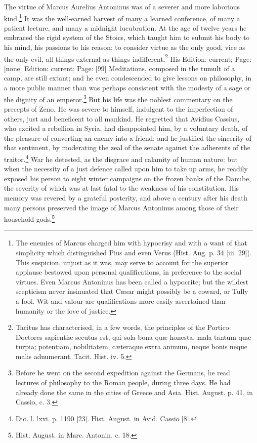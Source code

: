 The virtue of Marcus Aurelius Antoninus was of a severer and more laborious kind.\footnote{The enemies of Marcus charged him with hypocrisy and with a want of that simplicity which distinguished Pius and even Verus (Hist. Aug. p. 34 [iii. 29]). This suspicion, unjust as it was, may serve to account for the superior applause bestowed upon personal qualifications, in preference to the social virtues. Even Marcus Antoninus has been called a hypocrite; but the wildest scepticism never insinuated that Cæsar might possibly be a coward, or Tully a fool. Wit and valour are qualifications more easily ascertained than humanity or the love of justice.} It was the well-earned harvest of many a learned conference, of many a patient lecture, and many a midnight lucubration. At the age of twelve years he embraced the rigid system of the Stoics, which taught him to submit his body to his mind, his passions to his reason; to consider virtue as the only good, vice as the only evil, all things external as things indifferent.\footnote{Tacitus has characterised, in a few words, the principles of the Portico: Doctores sapientiæ secutus est, qui sola bona quæ honesta, mala tantum quæ turpia; potentiam, nobilitatem, cæteraque extra animum, neque bonis neque malis adnumerant. Tacit. Hist. iv. 5.} His Edition: current; Page: [none] Edition: current; Page: [99] Meditations, composed in the tumult of a camp, are still extant; and he even condescended to give lessons on philosophy, in a more public manner than was perhaps consistent with the modesty of a sage or the dignity of an emperor.\footnote{Before he went on the second expedition against the Germans, he read lectures of philosophy to the Roman people, during three days. He had already done the same in the cities of Greece and Asia. Hist. August. p. 41, in Cassio, c. 3.} But his life was the noblest commentary on the precepts of Zeno. He was severe to himself, indulgent to the imperfection of others, just and beneficent to all mankind. He regretted that Avidius Cassius, who excited a rebellion in Syria, had disappointed him, by a voluntary death, of the pleasure of converting an enemy into a friend; and he justified the sincerity of that sentiment, by moderating the zeal of the senate against the adherents of the traitor.\footnote{Dio. l. lxxi. p. 1190 [23]. Hist. August. in Avid. Cassio [8].} War he detested, as the disgrace and calamity of human nature; but when the necessity of a just defence called upon him to take up arms, he readily exposed his person to eight winter campaigns on the frozen banks of the Danube, the severity of which was at last fatal to the weakness of his constitution. His memory was revered by a grateful posterity, and above a century after his death many persons preserved the image of Marcus Antoninus among those of their household gods.\footnote{Hist. August. in Marc. Antonin. c. 18.}

